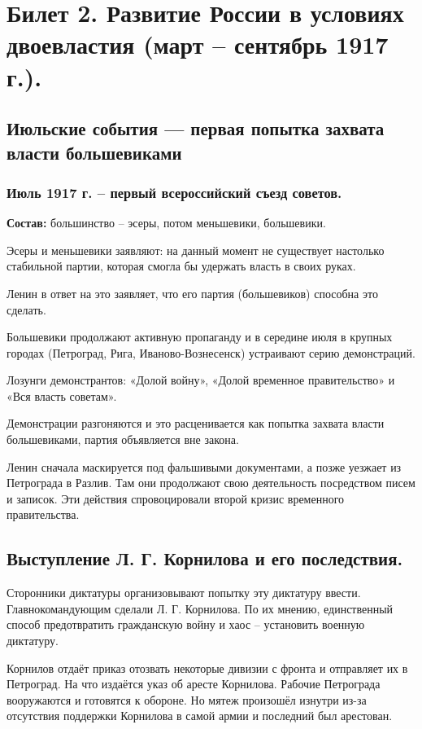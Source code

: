 \section{Билет 2. Развитие России в условиях двоевластия (март – сентябрь 1917 г.).}

\subsection{Июльские события — первая попытка захвата власти большевиками}

\subsubsection{\textbf{Июль 1917 г. – первый всероссийский съезд советов.}}

\textbf{Состав:} большинство – эсеры, потом меньшевики, большевики.

Эсеры и меньшевики заявляют: на данный момент не существует настолько стабильной партии, которая смогла бы удержать власть в своих руках.

Ленин в ответ на это заявляет, что его партия (большевиков) способна это сделать.

Большевики продолжают активную пропаганду и в середине июля в крупных городах (Петроград, Рига, Иваново-Вознесенск) устраивают серию демонстраций.

Лозунги демонстрантов: «Долой войну», «Долой временное правительство» и «Вся власть советам».

Демонстрации разгоняются и это расценивается как попытка захвата власти большевиками, партия объявляется вне закона.

Ленин сначала маскируется под фальшивыми документами, а позже уезжает из Петрограда в Разлив. Там они продолжают свою деятельность посредством писем и записок. Эти действия спровоцировали второй кризис временного правительства.

\subsection{Выступление Л. Г. Корнилова и его последствия.}

Сторонники диктатуры организовывают попытку эту диктатуру ввести. Главнокомандующим сделали Л. Г. Корнилова. По их мнению, единственный способ предотвратить гражданскую войну и хаос – установить военную диктатуру.

Корнилов отдаёт приказ отозвать некоторые дивизии с фронта и отправляет их в Петроград. На что издаётся указ об аресте Корнилова. Рабочие Петрограда вооружаются и готовятся к обороне. Но мятеж произошёл изнутри из-за отсутствия поддержки Корнилова в самой армии и последний был арестован.


